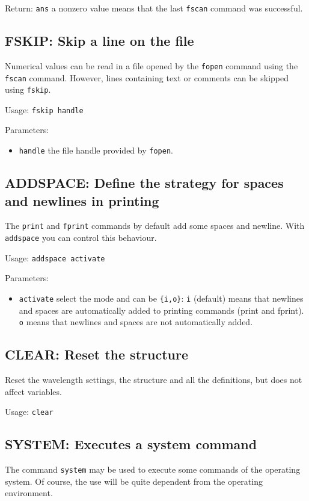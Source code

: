     Return:
    \lstinline!ans! a nonzero value means that the last \lstinline!fscan! command was successful.
    
\subsection{FSKIP: Skip a line on the file}
Numerical values can be read in a file opened by the \lstinline!fopen! command using the \lstinline!fscan! command. However, lines containing text or comments can be skipped using \lstinline!fskip!.

    Usage: \lstinline!fskip handle!
    
    Parameters:
    \begin{itemize}
    \item\lstinline!handle! the file handle provided by \lstinline!fopen!.
    \end{itemize}
    
\subsection{ADDSPACE: Define the strategy for spaces and newlines in printing}
    The \lstinline!print! and \lstinline!fprint! commands by default add some
    spaces and newline. With \lstinline!addspace! you can control this behaviour.

    Usage: \lstinline!addspace activate!
    
    Parameters:
    \begin{itemize}
        \item\lstinline!activate! select the mode and can be \lstinline!{i,o}!: \lstinline!i! (default) means that newlines and spaces
        are automatically added to printing commands (print and fprint).
            \lstinline!o! means that newlines and spaces are not automatically added.
    \end{itemize}
 
\subsection{CLEAR: Reset the structure}
\label{subsec_clear}
    Reset the wavelength settings, the structure and all the definitions, but does not affect variables.
    
    Usage: \lstinline!clear!
\subsection{SYSTEM: Executes a system command}
The command \lstinline!system! may be used to execute some commands of the operating system. Of course, the use will be quite dependent from the operating environment.

